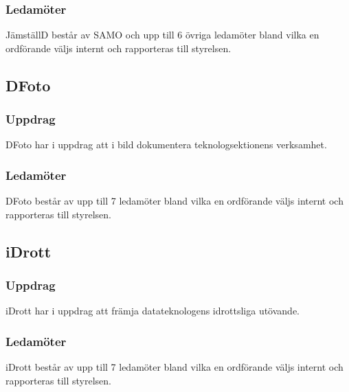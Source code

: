 \subsubsection{Ledamöter}
JämställD består av SAMO och upp till 6 övriga ledamöter bland vilka en ordförande väljs internt och rapporteras till styrelsen.

\subsection{DFoto}
\subsubsection{Uppdrag}
DFoto har i uppdrag att i bild dokumentera teknologsektionens verksamhet.
\subsubsection{Ledamöter}
DFoto består av upp till 7 ledamöter bland vilka en ordförande väljs internt och rapporteras till styrelsen.

\subsection{iDrott}
\subsubsection{Uppdrag}
iDrott har i uppdrag att främja datateknologens idrottsliga utövande.
\subsubsection{Ledamöter}
iDrott består av upp till 7 ledamöter bland vilka en ordförande väljs internt och rapporteras till styrelsen.

\newpage
